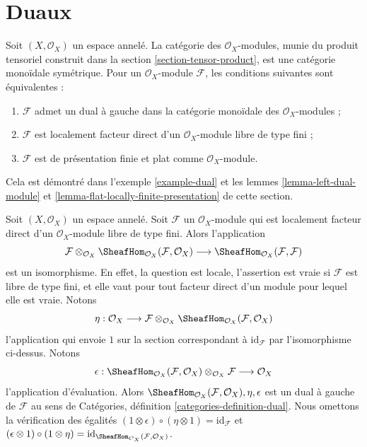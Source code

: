 \section{Duaux}
\label{section-duals}

\noindent
Soit $(X, \mathcal{O}_X)$ un espace annelé. La catégorie des
$\mathcal{O}_X$-modules, munie du produit tensoriel
construit dans la section \ref{section-tensor-product},
est une catégorie monoïdale symétrique. Pour un $\mathcal{O}_X$-module
$\mathcal{F}$, les conditions suivantes sont équivalentes :
\begin{enumerate}
\item $\mathcal{F}$ admet un dual à gauche dans la catégorie monoïdale
des $\mathcal{O}_X$-modules ;
\item $\mathcal{F}$ est localement facteur direct d'un
$\mathcal{O}_X$-module libre de type fini ;
\item $\mathcal{F}$ est de présentation finie et plat comme
$\mathcal{O}_X$-module.
\end{enumerate}
Cela est démontré dans l'exemple \ref{example-dual} et les
lemmes \ref{lemma-left-dual-module} et
\ref{lemma-flat-locally-finite-presentation} de cette section.

\begin{example}
\label{example-dual}
Soit $(X, \mathcal{O}_X)$ un espace annelé. Soit $\mathcal{F}$
un $\mathcal{O}_X$-module qui est localement facteur direct d'un
$\mathcal{O}_X$-module libre de type fini. Alors l'application
$$
\mathcal{F} \otimes_{\mathcal{O}_X}
\SheafHom_{\mathcal{O}_X}(\mathcal{F}, \mathcal{O}_X)
\longrightarrow
\SheafHom_{\mathcal{O}_X}(\mathcal{F}, \mathcal{F})
$$
est un isomorphisme. En effet, la question est locale, l'assertion est vraie
si $\mathcal{F}$ est libre de type fini, et elle vaut pour tout facteur direct
d'un module pour lequel elle est vraie. Notons
$$
\eta :
\mathcal{O}_X
\longrightarrow
\mathcal{F} \otimes_{\mathcal{O}_X}
\SheafHom_{\mathcal{O}_X}(\mathcal{F}, \mathcal{O}_X)
$$
l'application qui envoie $1$ sur la section correspondant à
$\text{id}_\mathcal{F}$ par l'isomorphisme ci-dessus. Notons
$$
\epsilon : 
\SheafHom_{\mathcal{O}_X}(\mathcal{F}, \mathcal{O}_X)
\otimes_{\mathcal{O}_X} \mathcal{F}
\longrightarrow
\mathcal{O}_X
$$
l'application d'évaluation. Alors
$\SheafHom_{\mathcal{O}_X}(\mathcal{F}, \mathcal{O}_X), \eta, \epsilon$
est un dual à gauche de $\mathcal{F}$ au sens de
Catégories, définition \ref{categories-definition-dual}.
Nous omettons la vérification des égalités
$(1 \otimes \epsilon) \circ (\eta \otimes 1) = \text{id}_\mathcal{F}$
et
$(\epsilon \otimes 1) \circ (1 \otimes \eta) =
\text{id}_{\SheafHom_{\mathcal{O}_X}(\mathcal{F}, \mathcal{O}_X)}$.
\end{example}

